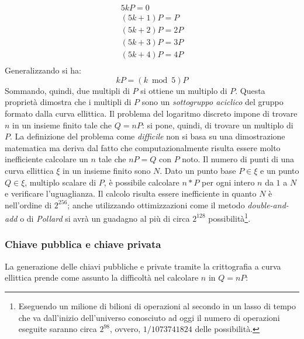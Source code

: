 \begin{equation}
    \begin{split}
        5kP = 0\\
        (5k+1)P = P\\
        (5k+2)P = 2P\\
        (5k+3)P = 3P\\
        (5k+4)P = 4P\\
    \end{split}
\end{equation}
Generalizzando si ha:
\begin{equation}
    kP = (k \bmod 5)P
\end{equation}
Sommando, quindi, due multipli di $P$ si ottiene un multiplo di $P$. Questa proprietà dimostra che i multipli di $P$ sono un \textit{sottogruppo aciclico} del gruppo formato dalla curva ellittica.\newline\newline
Il problema del logaritmo discreto impone di trovare $n$ in un insieme finito tale che $Q=nP$: si pone, quindi, di trovare un multiplo di $P$.\newline
La definizione del problema come \textit{difficile} non si basa su una dimostrazione matematica ma deriva dal fatto che computazionalmente risulta essere molto inefficiente calcolare un $n$ tale che $nP=Q$ con $P$ noto.\newline
Il numero di punti di una curva ellittica $\xi$ in un insieme finito sono $N$. Dato un punto base $P\in\xi$ e un punto $Q\in\xi$, multiplo scalare di $P$, è possibile calcolare $n*P$ per ogni intero $n$ da $1$ a $N$ e verificare l'uguaglianza. Il calcolo risulta essere inefficiente in quanto $N$ è nell'ordine di $2^{256}$; anche utilizzando ottimizzazioni come il metodo \textit{double-and-add} o di \textit{Pollard} si avrà un guadagno al più di circa $2^{128}$ possibilità\footnote{Eseguendo un milione di bilioni di operazioni al secondo in un lasso di tempo che va dall'inizio dell'universo conosciuto ad oggi il numero di operazioni eseguite saranno circa $2^{98}$, ovvero, $1/1073741824$ delle possibilità.}.

\subsubsection{Chiave pubblica e chiave privata}
La generazione delle chiavi pubbliche e private tramite la crittografia a curva ellittica prende come assunto la difficoltà nel calcolare $n$ in $Q=nP$:

